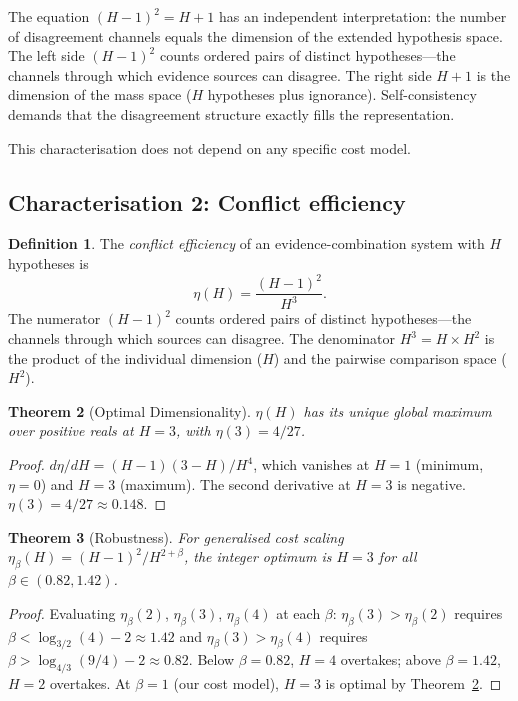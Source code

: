 \documentclass[11pt,a4paper]{article}
\newtheorem{theorem}{Theorem}[section]
\theoremstyle{definition}
\newtheorem{definition}[theorem]{Definition}
\theoremstyle{remark}
\begin{document}
The equation $(H-1)^2=H+1$ has an independent interpretation: the number of disagreement channels equals the dimension of the extended hypothesis space. The left side $(H-1)^2$ counts ordered pairs of distinct hypotheses---the channels through which evidence sources can disagree. The right side $H+1$ is the dimension of the mass space ($H$ hypotheses plus ignorance). Self-consistency demands that the disagreement structure exactly fills the representation.

This characterisation does not depend on any specific cost model.

\subsection{Characterisation 2: Conflict efficiency}

\begin{definition}\label{def:efficiency}
The \emph{conflict efficiency} of an evidence-combination system with $H$ hypotheses is
\begin{equation}\label{eq:eta}
\eta(H)=\frac{(H-1)^2}{H^3}.
\end{equation}
The numerator $(H-1)^2$ counts ordered pairs of distinct hypotheses---the channels through which sources can disagree. The denominator $H^3=H\times H^2$ is the product of the individual dimension ($H$) and the pairwise comparison space ($H^2$).
\end{definition}

\begin{theorem}[Optimal Dimensionality]\label{thm:optimal}
$\eta(H)$ has its unique global maximum over positive reals at $H=3$, with $\eta(3)=4/27$.
\end{theorem}

\begin{proof}
$d\eta/dH=(H-1)(3-H)/H^4$, which vanishes at $H=1$ (minimum, $\eta=0$) and $H=3$ (maximum). The second derivative at $H=3$ is negative. $\eta(3)=4/27\approx 0.148$.
\end{proof}

\begin{theorem}[Robustness]\label{thm:robust}
For generalised cost scaling $\eta_\beta(H)=(H-1)^2/H^{2+\beta}$, the integer optimum is $H=3$ for all $\beta\in(0.82,1.42)$.
\end{theorem}

\begin{proof}
Evaluating $\eta_\beta(2)$, $\eta_\beta(3)$, $\eta_\beta(4)$ at each $\beta$: $\eta_\beta(3)>\eta_\beta(2)$ requires $\beta<\log_{3/2}(4)-2\approx 1.42$ and $\eta_\beta(3)>\eta_\beta(4)$ requires $\beta>\log_{4/3}(9/4)-2\approx 0.82$. Below $\beta=0.82$, $H=4$ overtakes; above $\beta=1.42$, $H=2$ overtakes. At $\beta=1$ (our cost model), $H=3$ is optimal by Theorem~\ref{thm:optimal}.
\end{proof}
\end{document}
